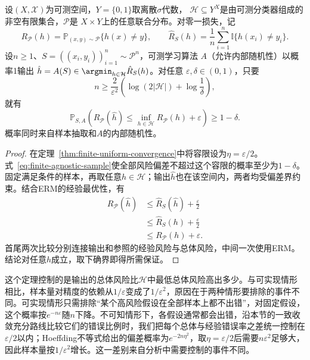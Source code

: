 \begin{theorem}[有限假设空间的不可知PAC样本量界]
\label{thm:finite-agnostic-pac}
设$(X,\mathcal X)$为可测空间，$Y=\{0,1\}$取离散$\sigma$代数，
$\mathcal H\subseteq Y^X$是由可测分类器组成的非空有限集合，$\mathcal P$是
$X\times Y$上的任意联合分布。对零一损失，记
\[
 R_{\mathcal P}(h)=\mathbb P_{(x,y)\sim\mathcal P}\{h(x)\neq y\},\qquad
 \hat R_S(h)=\frac1n\sum_{i=1}^n\mathbb I\{h(x_i)\neq y_i\}.
\]
设$n\geq1$、$S=((x_i,y_i))_{i=1}^n\sim\mathcal P^n$，可测学习算法
$A$（允许内部随机性）以概率1输出
$\hat h=A(S)\in\argmin_{h\in\mathcal H}\hat R_S(h)$。对任意
$\varepsilon,\delta\in(0,1)$，只要
\begin{equation}
 n\geq\frac{2}{\varepsilon^2}
 \left(\log(2|\mathcal H|)+\log\frac1\delta\right),
 \label{eq:finite-agnostic-sample}
\end{equation}
就有
\[
 \mathbb P_{S,A}\left(
 R_{\mathcal P}(\hat h)\leq\inf_{h\in\mathcal H}R_{\mathcal P}(h)+\varepsilon
 \right)\geq1-\delta.
\]
概率同时来自样本抽取和$A$的内部随机性。
\end{theorem}

\begin{proof}
在定理~\ref{thm:finite-uniform-convergence}中将容限设为$\eta=\varepsilon/2$。式~\eqref{eq:finite-agnostic-sample}使全部风险偏差不超过这个容限的概率至少为$1-\delta$。固定满足条件的样本，再取任意$h\in\mathcal H$；输出$\hat h$也在该空间内，两者均受偏差界约束。结合ERM的经验最优性，有
\begin{align*}
 R_{\mathcal P}(\hat h)
 &\leq\hat R_S(\hat h)+\frac{\varepsilon}{2}\\
 &\leq\hat R_S(h)+\frac{\varepsilon}{2}\\
 &\leq R_{\mathcal P}(h)+\varepsilon.
\end{align*}
首尾两次比较分别连接输出和参照的经验风险与总体风险，中间一次使用ERM。结论对任意$h$成立，取下确界即得所需保证。
\end{proof}

这个定理控制的是输出的总体风险比$\mathcal H$中最低总体风险高出多少。与可实现情形相比，样本量对精度的依赖从$1/\varepsilon$变成了$1/\varepsilon^2$，原因在于两种情形要排除的事件不同。可实现情形只需排除“某个高风险假设在全部样本上都不出错”，对固定假设，这个概率按$e^{-n\varepsilon}$随$n$下降。不可知情形下，各假设通常都会出错，沿本节的一致收敛充分路线比较它们的错误比例时，我们把每个总体与经验错误率之差统一控制在$\varepsilon/2$以内；Hoeffding不等式给出的偏差概率为$e^{-2n\eta^2}$，取$\eta=\varepsilon/2$后需要$n\varepsilon^2$足够大，因此样本量按$1/\varepsilon^2$增长。这一差别来自分析中需要控制的事件不同。

